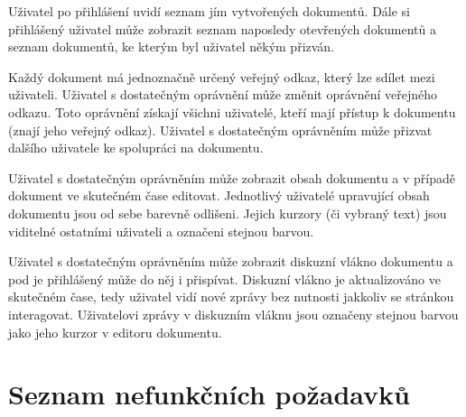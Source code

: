 Uživatel po přihlášení uvidí seznam jím vytvořených dokumentů.
Dále si přihlášený uživatel může zobrazit seznam naposledy otevřených dokumentů a seznam dokumentů, ke kterým byl uživatel někým přizván.

Každý dokument má jednoznačně určený veřejný odkaz, který lze sdílet mezi uživateli.
Uživatel s dostatečným oprávnění může změnit oprávnění veřejného odkazu.
Toto oprávnění získají všichni uživatelé, kteří mají přístup k dokumentu (znají jeho veřejný odkaz).
Uživatel s dostatečným oprávněním může přizvat dalšího uživatele ke spolupráci na dokumentu.

Uživatel s dostatečným oprávněním může zobrazit obsah dokumentu a v případě dokument ve skutečném čase editovat.
Jednotlivý uživatelé upravující obsah dokumentu jsou od sebe barevně odlišeni.
Jejich kurzory (či vybraný text) jsou viditelné ostatními uživateli a označeni stejnou barvou.

Uživatel s dostatečným oprávněním může zobrazit diskuzní vlákno dokumentu a pod je přihlášený může do něj i přispívat.
Diskuzní vlákno je aktualizováno ve skutečném čase, tedy uživatel vidí nové zprávy bez nutnosti jakkoliv se stránkou interagovat.
Uživatelovi zprávy v diskuzním vláknu jsou označeny stejnou barvou jako jeho kurzor v editoru dokumentu.


\section{Seznam nefunkčních požadavků}\label{sec:nefuncniPozadavky}

